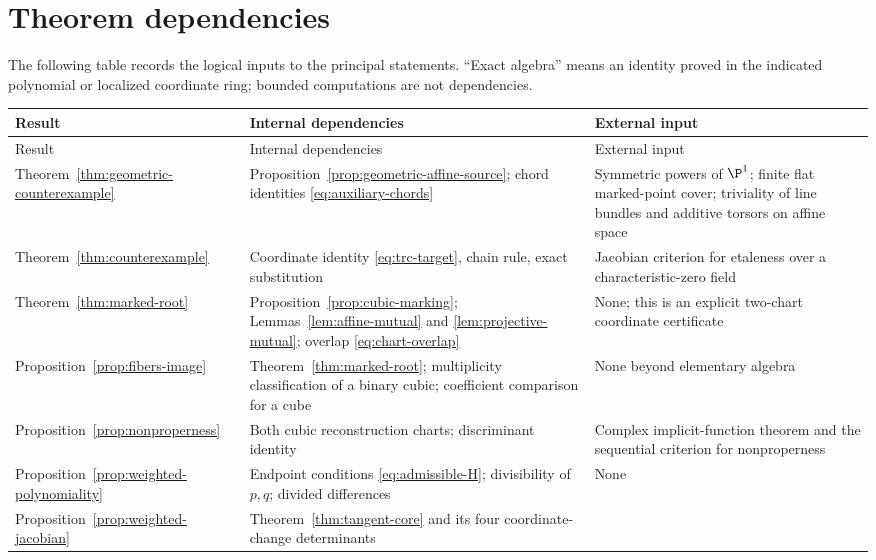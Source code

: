\section{Theorem dependencies}\label{app:dependencies}

The following table records the logical inputs to the principal statements.
``Exact algebra'' means an identity proved in the indicated polynomial or
localized coordinate ring; bounded computations are not dependencies.

\small
\begin{longtable}{>{\raggedright\arraybackslash}p{}
                  >{\raggedright\arraybackslash}p{}
                  >{\raggedright\arraybackslash}p{}}
\toprule
Result & Internal dependencies & External input \\
\midrule
\endfirsthead
\toprule
Result & Internal dependencies & External input \\
\midrule
\endhead
Theorem~\ref{thm:geometric-counterexample} &
Proposition~\ref{prop:geometric-affine-source}; chord identities
\eqref{eq:auxiliary-chords} &
Symmetric powers of $\P^1$; finite flat marked-point cover; triviality of line
bundles and additive torsors on affine space \\
\addlinespace
Theorem~\ref{thm:counterexample} &
Coordinate identity \eqref{eq:trc-target}, chain rule, exact substitution &
Jacobian criterion for etaleness over a characteristic-zero field \\
\addlinespace
Theorem~\ref{thm:marked-root} &
Proposition~\ref{prop:cubic-marking}; Lemmas~\ref{lem:affine-mutual} and
\ref{lem:projective-mutual}; overlap \eqref{eq:chart-overlap} &
None; this is an explicit two-chart coordinate certificate \\
\addlinespace
Proposition~\ref{prop:fibers-image} &
Theorem~\ref{thm:marked-root}; multiplicity classification of a binary cubic;
coefficient comparison for a cube & None beyond elementary algebra \\
\addlinespace
Proposition~\ref{prop:nonproperness} &
Both cubic reconstruction charts; discriminant identity &
Complex implicit-function theorem and the sequential criterion for
nonproperness \\
\addlinespace
Proposition~\ref{prop:weighted-polynomiality} &
Endpoint conditions \eqref{eq:admissible-H}; divisibility of $p,q$; divided
differences & None \\
\addlinespace
Proposition~\ref{prop:weighted-jacobian} &
Theorem~\ref{thm:tangent-core} and its four coordinate-change determinants &

\end{longtable}
